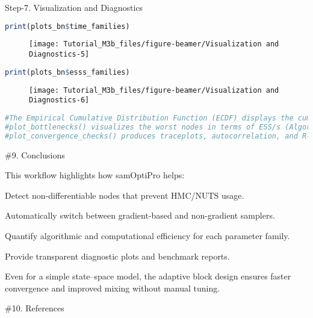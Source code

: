 \documentclass[
  10pt,
  ignorenonframetext,
  aspectratio=169]{beamer}
\begin{document}
\begin{frame}[fragile]{Step-7. Visualization and Diagnostics}
\begin{lstlisting}[language=R]
print(plots_bn$time_families)
\end{lstlisting}

\begin{figure}
\texttt{[image: Tutorial\_M3b\_files/figure-beamer/Visualization and Diagnostics-5]} \end{figure}

\begin{lstlisting}[language=R]
print(plots_bn$esss_families)
\end{lstlisting}

\begin{figure}
\texttt{[image: Tutorial\_M3b\_files/figure-beamer/Visualization and Diagnostics-6]} \end{figure}

\begin{lstlisting}[language=R]
#The Empirical Cumulative Distribution Function (ECDF) displays the cumulative proportion of nodes whose Rhat is below a certain threshold.
#plot_bottlenecks() visualizes the worst nodes in terms of ESS/s (Algorithmic Efficiency) and runtime (Computational Efficiency).
#plot_convergence_checks() produces traceplots, autocorrelation, and R-hat diagnostics for the top problematic parameters
\end{lstlisting}

\#9. Conclusions

This workflow highlights how samOptiPro helps:

Detect non-differentiable nodes that prevent HMC/NUTS usage.

Automatically switch between gradient-based and non-gradient samplers.

Quantify algorithmic and computational efficiency for each parameter
family.

Provide transparent diagnostic plots and benchmark reports.

Even for a simple state--space model, the adaptive block design ensures
faster convergence and improved mixing without manual tuning.

\#10. References
\end{frame}
\end{document}
